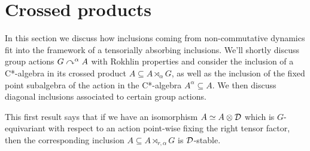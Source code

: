 \documentclass[12pt]{amsart}
\begin{document}
  \section{Crossed products}\label{section:dse-crossed-products}

  In this section we discuss how inclusions coming from non-commutative dynamics fit into the framework of a tensorially absorbing inclusions. We'll shortly discuss group actions $G \curvearrowright^\alpha A$ with Rokhlin properties and consider the inclusion of a C*-algebra in its crossed product $A \subseteq A \rtimes_\alpha G$, as well as the inclusion of the fixed point subalgebra of the action in the C*-algebra $A^\alpha \subseteq A$. We then discuss diagonal inclusions associated to certain group actions. 

  This first result says that if we have an isomorphism $A \simeq A \otimes \mathcal{D}$ which is $G$-equivariant with respect to an action point-wise fixing the right tensor factor, then the corresponding inclusion $A \subseteq A \rtimes_{r,\alpha} G$ is $\mathcal{D}$-stable.  
\end{document}
